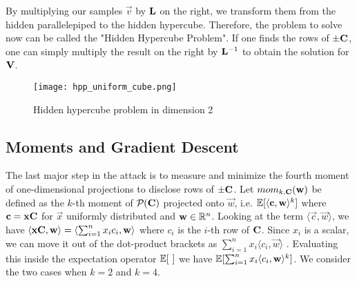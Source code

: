 By multiplying our samples $\vec{v}$ by $\mathbf{L}$ on the right, we transform them from the hidden parallelepiped to the hidden hypercube. 
Therefore, the problem to solve now can be called the "Hidden Hypercube Problem".
If one finds the rows of $\pm \mathbf{C}$, one can simply multiply the result on the right by $\mathbf{L}^{-1}$ to obtain the solution for $\mathbf{V}$.

\begin{figure}[H]
    \centering
    \texttt{[image: hpp\_uniform\_cube.png]}
    \caption{Hidden hypercube problem in dimension 2}
  	\medskip 
    \label{hpp_uniform_cube}
\end{figure}
\subsection{Moments and Gradient Descent}
The last major step in the attack is to measure and minimize the fourth moment of one-dimensional projections to disclose rows of $\pm \mathbf{C}$.
Let $mom_{k, \mathbf{C}}(\mathbf{w})$ be defined as the $k$-th moment of $\mathcal{P}_{}(\mathbf{C})$ projected onto $\vec{w}$, i.e. 
$\mathbb{E}[\langle \mathbf{c}, \mathbf{w} \rangle ^k]$ where $\mathbf{c} = \mathbf{x} \mathbf{C}$ for $\vec{x}$ uniformly distributed and $\mathbf{w} \in \mathbb{R}^n$.
Looking at the term $\langle \vec{c}, \vec{w} \rangle$, we have $\langle \mathbf{x} \mathbf{C}, \mathbf{w} \rangle = \langle \sum_{i=1}^{n} x_i c_i, \mathbf{w} \rangle$
where $c_i$ is the $i$-th row of $\mathbf{C}$. Since $x_i$ is a scalar, we can move it out of the dot-product brackets as $\sum_{i=1}^{n} x_i \langle c_i, \vec{w} \rangle $ .
Evaluating this inside the expectation operator $\mathbb{E}[ \ ]$ we have $\mathbb{E}[\sum_{i=1}^{n} x_i \langle c_i, \mathbf{w} \rangle ^k ]$.
We consider the two cases when $k = 2$ and $k=4$.
